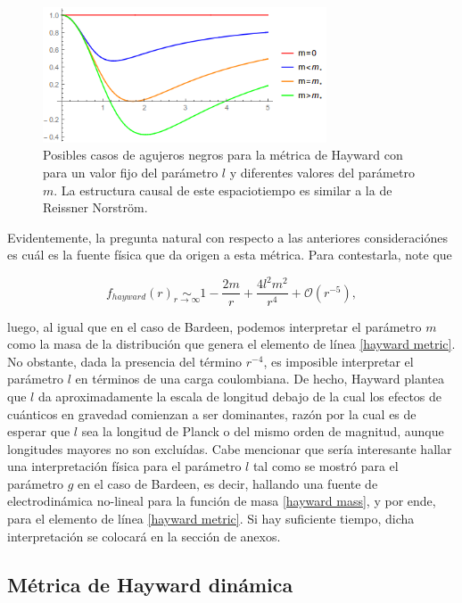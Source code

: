 \documentclass{article}
\numberwithin{equation}{section}
\theoremstyle{definition}
\begin{document}
\begin{figure}[h!]
	\centering
	\includegraphics[width=0.75\textwidth]{fhaywardAnalysis}
	\caption{Posibles casos de agujeros negros para la métrica de Hayward con para un valor fijo del parámetro $l$ y diferentes valores del parámetro $m$. La estructura causal de este espaciotiempo es similar a la de Reissner Norström.}
	\label{fig: fhayward analysis}
\end{figure}

Evidentemente, la pregunta natural con respecto a las anteriores consideraciónes es cuál es la fuente física que da origen a esta métrica. Para contestarla, note que 

\begin{equation}
f_{hayward}(r) \underset{r \to \infty}{\sim} 1 - \frac{2m}{r} + \frac{4l^2m^2}{r^4} + \mathcal{O}(r^{-5}),
\end{equation}

luego, al igual que en el caso de Bardeen, podemos interpretar el parámetro $m$ como la masa de la distribución que genera el elemento de línea \eqref{hayward metric}. No obstante, dada la presencia del término $r^{-4}$, es imposible interpretar el parámetro $l$ en términos de una carga coulombiana. De hecho, Hayward plantea que $l$ da aproximadamente la escala de longitud debajo de la cual los efectos de cuánticos en gravedad comienzan a ser dominantes, razón por la cual es de esperar que $l$ sea la longitud de Planck o del mismo orden de magnitud, aunque longitudes mayores no son excluídas. Cabe mencionar que sería interesante hallar una interpretación física para el parámetro $l$ tal como se mostró para el parámetro $g$ en el caso de Bardeen, es decir, hallando una fuente de electrodinámica no-lineal para la función de masa \eqref{hayward mass}, y por ende, para el elemento de línea \eqref{hayward metric}. Si hay suficiente tiempo, dicha interpretación se colocará en la sección de anexos.\\


\subsection{Métrica de Hayward dinámica}
\end{document}
